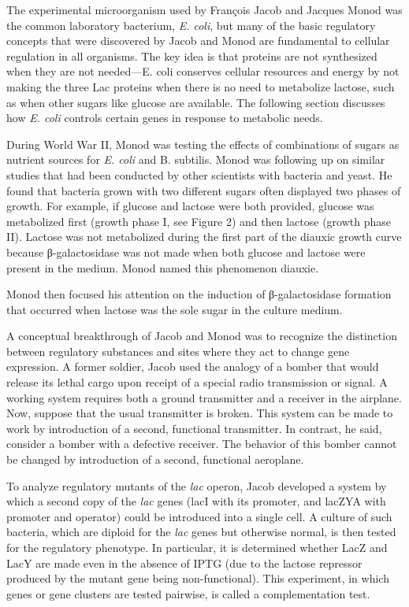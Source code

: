 The experimental microorganism used by François Jacob and Jacques Monod was the common laboratory bacterium, \emph{E. coli}, but many of the basic regulatory concepts that were discovered by Jacob and Monod are fundamental to cellular regulation in all organisms. The key idea is that proteins are not synthesized when they are not needed---E. coli conserves cellular resources and energy by not making the three Lac proteins when there is no need to metabolize lactose, such as when other sugars like glucose are available. The following section discusses how \emph{E. coli} controls certain genes in response to metabolic needs.

During World War II, Monod was testing the effects of combinations of sugars as nutrient sources for \emph{E. coli} and B. subtilis. Monod was following up on similar studies that had been conducted by other scientists with bacteria and yeast. He found that bacteria grown with two different sugars often displayed two phases of growth. For example, if glucose and lactose were both provided, glucose was metabolized first (growth phase I, see Figure 2) and then lactose (growth phase II). Lactose was not metabolized during the first part of the diauxic growth curve because β-galactosidase was not made when both glucose and lactose were present in the medium. Monod named this phenomenon diauxie.

Monod then focused his attention on the induction of β-galactosidase formation that occurred when lactose was the sole sugar in the culture medium.

A conceptual breakthrough of Jacob and Monod was to recognize the distinction between regulatory substances and sites where they act to change gene expression. A former soldier, Jacob used the analogy of a bomber that would release its lethal cargo upon receipt of a special radio transmission or signal. A working system requires both a ground transmitter and a receiver in the airplane. Now, suppose that the usual transmitter is broken. This system can be made to work by introduction of a second, functional transmitter. In contrast, he said, consider a bomber with a defective receiver. The behavior of this bomber cannot be changed by introduction of a second, functional aeroplane.

To analyze regulatory mutants of the \emph{lac} operon, Jacob developed a system by which a second copy of the \emph{lac} genes (lacI with its promoter, and lacZYA with promoter and operator) could be introduced into a single cell. A culture of such bacteria, which are diploid for the \emph{lac} genes but otherwise normal, is then tested for the regulatory phenotype. In particular, it is determined whether LacZ and LacY are made even in the absence of IPTG (due to the lactose repressor produced by the mutant gene being non-functional). This experiment, in which genes or gene clusters are tested pairwise, is called a complementation test.



